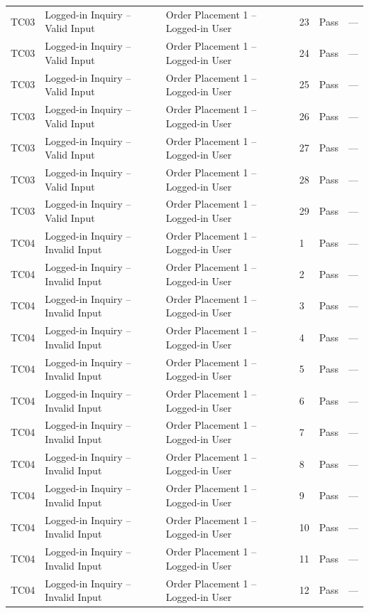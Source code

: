 {\begin{longtable}{@{}p{1.2cm} p{4.2cm} p{4.4cm} p{0.8cm} p{0.9cm} p{1.6cm}@{}}
  TC03 & Logged-in Inquiry -- Valid Input & Order Placement 1 -- Logged-in User & 23 & Pass & --- \\
  TC03 & Logged-in Inquiry -- Valid Input & Order Placement 1 -- Logged-in User & 24 & Pass & --- \\
  TC03 & Logged-in Inquiry -- Valid Input & Order Placement 1 -- Logged-in User & 25 & Pass & --- \\
  TC03 & Logged-in Inquiry -- Valid Input & Order Placement 1 -- Logged-in User & 26 & Pass & --- \\
  TC03 & Logged-in Inquiry -- Valid Input & Order Placement 1 -- Logged-in User & 27 & Pass & --- \\
  TC03 & Logged-in Inquiry -- Valid Input & Order Placement 1 -- Logged-in User & 28 & Pass & --- \\
  TC03 & Logged-in Inquiry -- Valid Input & Order Placement 1 -- Logged-in User & 29 & Pass & --- \\
  \midrule
  TC04 & Logged-in Inquiry -- Invalid Input & Order Placement 1 -- Logged-in User & 1 & Pass & --- \\
  TC04 & Logged-in Inquiry -- Invalid Input & Order Placement 1 -- Logged-in User & 2 & Pass & --- \\
  TC04 & Logged-in Inquiry -- Invalid Input & Order Placement 1 -- Logged-in User & 3 & Pass & --- \\
  TC04 & Logged-in Inquiry -- Invalid Input & Order Placement 1 -- Logged-in User & 4 & Pass & --- \\
  TC04 & Logged-in Inquiry -- Invalid Input & Order Placement 1 -- Logged-in User & 5 & Pass & --- \\
  TC04 & Logged-in Inquiry -- Invalid Input & Order Placement 1 -- Logged-in User & 6 & Pass & --- \\
  TC04 & Logged-in Inquiry -- Invalid Input & Order Placement 1 -- Logged-in User & 7 & Pass & --- \\
  TC04 & Logged-in Inquiry -- Invalid Input & Order Placement 1 -- Logged-in User & 8 & Pass & --- \\
  TC04 & Logged-in Inquiry -- Invalid Input & Order Placement 1 -- Logged-in User & 9 & Pass & --- \\
  TC04 & Logged-in Inquiry -- Invalid Input & Order Placement 1 -- Logged-in User & 10 & Pass & --- \\
  TC04 & Logged-in Inquiry -- Invalid Input & Order Placement 1 -- Logged-in User & 11 & Pass & --- \\
  TC04 & Logged-in Inquiry -- Invalid Input & Order Placement 1 -- Logged-in User & 12 & Pass & --- \\

\end{longtable}}

